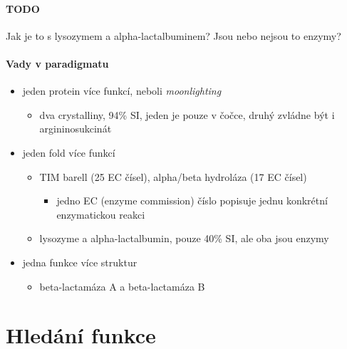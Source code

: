 \documentclass[DIV=8]{scrreprt}
\newcommand{\mybox}[2]{
    \paragraph{#1} #2
}
\begin{document}
\mybox{TODO}{Jak je to s lysozymem a alpha-lactalbuminem? Jsou nebo nejsou to enzymy?}


\paragraph{Vady v paradigmatu}
\begin{itemize}[nosep]
    \item jeden protein více funkcí, neboli \emph{moonlighting}
\begin{itemize}[nosep]
    \item dva crystalliny, 94\% SI, jeden je pouze v čočce, druhý zvládne být i argininosukcinát
\end{itemize}

    \item jeden fold více funkcí
\begin{itemize}[nosep]
    \item TIM barell (25 EC čísel), alpha/beta hydroláza (17 EC čísel)
\begin{itemize}[nosep]
    \item jedno EC (enzyme commission) číslo popisuje jednu konkrétní enzymatickou reakci
\end{itemize}

    \item lysozyme a alpha-lactalbumin, pouze 40\% SI, ale oba jsou enzymy
\end{itemize}

    \item jedna funkce více struktur
\begin{itemize}[nosep]
    \item beta-lactamáza A a beta-lactamáza B
\end{itemize}

\end{itemize}



\section{Hledání funkce} \label{Hledání funkce}
\end{document}
